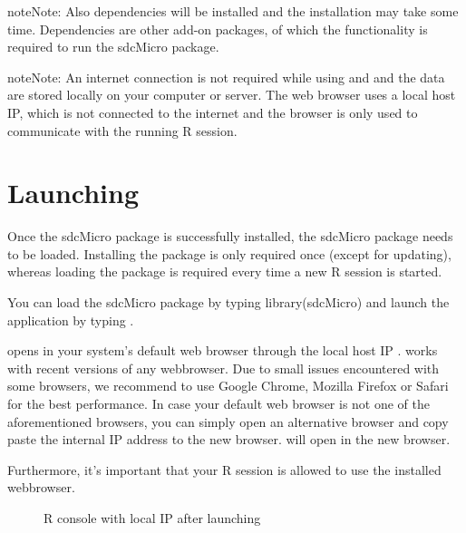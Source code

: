 \documentclass[letterpaper,10pt,english]{sphinxmanual}
\begin{document}
\begin{sphinxadmonition}{note}{Note:}
Also dependencies will be installed and the installation may take some time.
Dependencies are other add-on packages, of which the functionality is required to run the sdcMicro package.
\end{sphinxadmonition}

\begin{sphinxadmonition}{note}{Note:}
An internet connection is not required while using  and  and the data
are stored locally on your computer or server. The web browser uses a local host IP,
which is not connected to the internet and the browser is only used to communicate with
the running R session.
\end{sphinxadmonition}


\section{Launching }
\label{\detokenize{installation:launching-sdcapp}}
Once the sdcMicro package is successfully installed, the sdcMicro package needs to be loaded.
Installing the package is only required once (except for updating), whereas loading the
package is required every time a new R session is started.

You can load the sdcMicro package by typing library(sdcMicro) and launch the application by typing .

 opens in your system’s default web browser through the local host IP .
 works with recent versions of any webbrowser.
Due to small issues encountered with some browsers, we recommend to use Google Chrome, Mozilla Firefox or Safari for the best performance.
In case your default web browser is not one of the aforementioned browsers, you can simply open an
alternative browser and copy paste the internal IP address to the new browser.  will open
in the new browser.

Furthermore, it’s important that your R session is allowed to use the installed webbrowser.

\begin{figure}[htbp]
\centering
\capstart

\noindent{}
\caption{R console with local IP after launching }\label{\detokenize{installation:fig25}}\label{\detokenize{installation:id11}}\end{figure}
\end{document}
